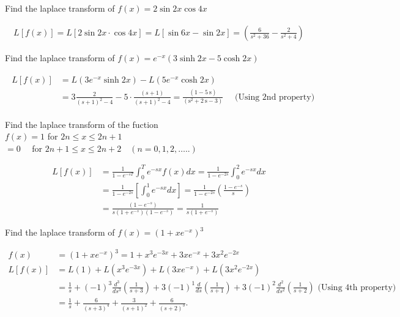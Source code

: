 \begin{exercise}
	Find the laplace transform of $f(x)=2 \sin 2 x \cos 4 x$
\end{exercise}
\begin{answer}
	\begin{align*}
	L[f(x)]=L[2 \sin 2 x \cdot \cos 4 x]=L[\sin 6 x-\sin 2 x]=\left(\frac{6}{s^{2}+36}-\frac{2}{s^{2}+4}\right)
	\end{align*}
\end{answer}
\begin{exercise}
Find the laplace transform of $f(x)=e^{-x}(3 \sinh 2 x-5 \cosh 2 x)$
\end{exercise}
\begin{answer}
	\begin{align*}
	\begin{aligned}
	L[f(x)] &=L\left(3 e^{-x} \sinh 2 x\right)-L\left(5 e^{-x} \cosh 2 x\right) \\
	&=3 \frac{2}{(s+1)^{2}-4}-5 \cdot \frac{(s+1)}{(s+1)^{2}-4}=\frac{(1-5 \mathrm{~s})}{\left(\mathrm{s}^{2}+2 \mathrm{~s}-3\right)} \quad \text { (Using 2nd property) }
	\end{aligned}
	\end{align*}
\end{answer}
\begin{exercise}
	Find the laplace transform of the fuction\\
	$f(x)=1$ for $2 n \leq x \leq 2 n+1$\\
	$=0 \quad$ for $2 n+1 \leq x \leq 2 n+2 \quad(n=0,1,2, \ldots . .)$
\end{exercise}
\begin{answer}
	\begin{align*}
	L[f(x)] &=\frac{1}{1-e^{-s T}} \int_{0}^{T} e^{-s x} f(x) d x=\frac{1}{1-e^{-2 s}} \int_{0}^{2} e^{-s x} d x \\
	&=\frac{1}{1-e^{-2 s}}\left[\int_{0}^{1} e^{-s x} d x\right]=\frac{1}{1-e^{-2 s}}\left(\frac{1-e^{-s}}{s}\right)\\
	&=\frac{\left(1-e^{-s}\right)}{s\left(1+e^{-s}\right)\left(1-e^{-s}\right)}=\frac{1}{s\left(1+e^{-s}\right)}
	\end{align*}
\end{answer}
\begin{exercise}
	Find the laplace transform of $f(x)=\left(1+x e^{-x}\right)^{3}$
\end{exercise}
\begin{answer}
	\begin{align*}
	f(x)&=\left(1+x e^{-x}\right)^{3}=1+x^{3} e^{-3 x}+3 x e^{-x}+3 x^{2} e^{-2 x} \\
	L[f(x)]&=L(1)+L\left(x^{3} e^{-3 x}\right)+L\left(3 x e^{-x}\right)+L\left(3 x^{2} e^{-2 x}\right)\\
	&=\frac{1}{s}+(-1)^{3} \frac{d^{3}}{d s^{3}}\left(\frac{1}{s+3}\right)+3(-1)^{1} \frac{d}{d s}\left(\frac{1}{s+1}\right)+3(-1)^{2} \frac{d^{2}}{d s^{2}}\left(\frac{1}{s+2}\right)\text{ (Using 4th property)}\\
	&=\frac{1}{s}+\frac{6}{(s+3)^{4}}+\frac{3}{(s+1)^{2}}+\frac{6}{(s+2)^{3}} \text {. }
	\end{align*}
\end{answer}
